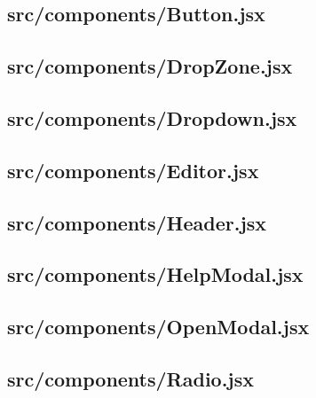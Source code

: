 \subsection{src/components/Button.jsx}
\label{app:client_src_components_Button_jsx}

\subsection{src/components/DropZone.jsx}
\label{app:client_src_components_DropZone_jsx}

\subsection{src/components/Dropdown.jsx}
\label{app:client_src_components_Dropdown_jsx}

\subsection{src/components/Editor.jsx}
\label{app:client_src_components_Editor_jsx}

\subsection{src/components/Header.jsx}
\label{app:client_src_components_Header_jsx}

\subsection{src/components/HelpModal.jsx}
\label{app:client_src_components_HelpModal_jsx}

\subsection{src/components/OpenModal.jsx}
\label{app:client_src_components_OpenModal_jsx}

\subsection{src/components/Radio.jsx}
\label{app:client_src_components_Radio_jsx}


